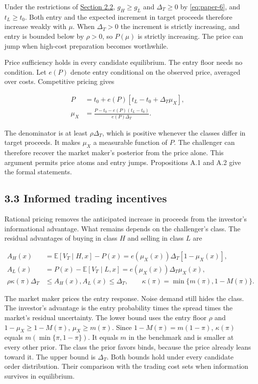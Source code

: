 Under the restrictions of
\hyperref[sec-values-preparation-and-the-sale]{Section 2.2},
\(g_H\ge g_L\) and \(\Delta_T\ge0\) by \eqref{eq:paper-6}, and
\(t_L\ge t_0\). Both entry and the expected increment in target
proceeds therefore increase weakly with \(\mu\). When \(\Delta_T>0\) the
increment is strictly increasing, and entry is bounded below by
\(\rho>0\), so \(P(\mu)\) is strictly increasing. The price can jump
when high-cost preparation becomes worthwhile.

Price sufficiency holds in every candidate equilibrium. The entry
floor needs no condition. Let \(e(P)\) denote entry conditional on
the observed price, averaged over costs. Competitive pricing gives

\[
\begin{aligned}
P&=t_0+e(P)[t_L-t_0+\Delta_T\mu_X],\\
\mu_X&=\frac{P-t_0-e(P)(t_L-t_0)}{e(P)\Delta_T}.
\end{aligned}
\tag{10}\label{eq:paper-10}
\]

The denominator is at least \(\rho\Delta_T\), which is positive whenever
the classes differ in target proceeds. It makes \(\mu_X\) a measurable
function of \(P\). The challenger can therefore recover the market
maker's posterior from the price alone. This argument permits price
atoms and entry jumps. Propositions A.1 and A.2 give the formal
statements.

\subsection{3.3 Informed trading
incentives}\label{sec-informed-trading-incentives}

Rational pricing removes the anticipated increase in proceeds from the
investor's informational advantage. What remains depends on the
challenger's class. The residual advantages of buying in class \(H\) and
selling in class \(L\) are

\[
\begin{aligned}
A_H(x)&=\mathbb E[V_T\mid H,x]-P(x)=e(\mu_X(x))\Delta_T[1-\mu_X(x)],\\
A_L(x)&=P(x)-\mathbb E[V_T\mid L,x]=e(\mu_X(x))\Delta_T\mu_X(x),\\
\rho\kappa(\pi)\Delta_T&\le A_H(x),A_L(x)\le\Delta_T,\qquad
\kappa(\pi)=\min\{m(\pi),1-M(\pi)\}.
\end{aligned}
\tag{11}\label{eq:paper-11}
\]

The market maker prices the entry response. Noise demand still hides
the class. The investor's advantage is the entry probability times
the spread times the market's residual uncertainty. The lower bound
uses the entry floor \(\rho\) and \(1-\mu_X\ge1-M(\pi)\),
\(\mu_X\ge m(\pi)\). Since \(1-M(\pi)=m(1-\pi)\), \(\kappa(\pi)\)
equals \(m(\min\{\pi,1-\pi\})\). It equals \(m\) in the benchmark and
is smaller at every other prior. The class the prior favors binds,
because the price already leans toward it. The upper bound is
\(\Delta_T\). Both bounds hold under every candidate order
distribution. Their comparison with the trading cost sets when
information survives in equilibrium.

